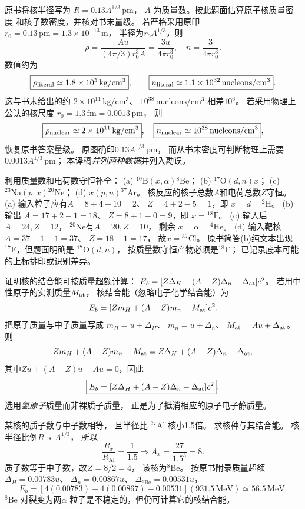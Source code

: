原书将核半径写为
$R=0.13A^{1/3}\,\mathrm{pm}$，
$A$ 为质量数。按此题面估算原子核质量密度
和核子数密度，并核对书末量级。
\exsolution
若严格采用原印
$r_0=0.13\,\mathrm{pm}=1.3\times10^{-13}\,\mathrm m$，
半径为$r_0A^{1/3}$，则
\[
 \rho=\frac{Au}{(4\pi/3)r_0^3A}
 =\frac{3u}{4\pi r_0^3},\quad
 n=\frac{3}{4\pi r_0^3}.
\]
数值约为
\[
 \boxed{\rho_{\rm literal}\simeq
 1.8\times10^{5}\,\mathrm{kg/cm^3}},\qquad
 \boxed{n_{\rm literal}\simeq
 1.1\times10^{32}\,\mathrm{nucleons/cm^3}}.
\]
这与书末给出的约
$2\times10^{11}\,\mathrm{kg/cm^3}$、
$10^{38}\,\mathrm{nucleons/cm^3}$
相差$10^6$。
若采用物理上公认的核尺度
$r_0=1.3\,\mathrm{fm}=0.0013\,\mathrm{pm}$，
则
\[
 \boxed{\rho_{\rm nuclear}\simeq
 2\times10^{11}\,\mathrm{kg/cm^3}},\quad
 \boxed{n_{\rm nuclear}\simeq
 10^{38}\,\mathrm{nucleons/cm^3}},
\]
恢复原书答案量级。
\excheck 原图确印$0.13A^{1/3}\,\mathrm{pm}$，
而从书末密度可判断物理上需要
$0.0013A^{1/3}\,\mathrm{pm}$；
本译稿\emph{并列两种数据}并列入勘误。

利用质量数和电荷数守恒补全：
(a) $\mathrm{^{10}B}(x,\alpha)\mathrm{^{8}Be}$；
(b) $\mathrm{^{17}O}(d,n)x$；
(c) $\mathrm{^{23}Na}(p,x)\mathrm{^{20}Ne}$；
(d) $x(p,n)\mathrm{^{37}Ar}$。
\exsolution
核反应的核子总数$A$和电荷总数$Z$守恒。
(a) 输入粒子应有$A=8+4-10=2$、
$Z=4+2-5=1$，即
$\boxed{x=d=\mathrm{^{2}H}}$。
(b) 输出
$A=17+2-1=18$、
$Z=8+1-0=9$，即
$\boxed{x=\mathrm{^{18}F}}$。
(c) 输入后$A=24,Z=12$，
$\mathrm{^{20}Ne}$有$A=20,Z=10$，
剩余 $\boxed{x=\alpha=\mathrm{^{4}He}}$。
(d) 输入靶核$A=37+1-1=37$、
$Z=18-1=17$，
故$\boxed{x=\mathrm{^{37}Cl}}$。
\excheck 原书简答(b)纯文本出现
$\mathrm{^{17}F}$，但题面明确是
$\mathrm{^{17}O}(d,n)$，
按质量数守恒产物必须是$\mathrm{^{18}F}$；
已记录底本可能的上标排印或识别差异。

证明核的结合能可按质量超额计算：
$E_b=[Z\Delta_H+(A-Z)\Delta_n-\Delta_{\rm at}]c^2$。
\exsolution
若用中性原子的实测质量$M_{\rm at}$，
核结合能（忽略电子化学结合能）为
\[
 E_b=[Zm_H+(A-Z)m_n-M_{\rm at}]c^2.
\]
把原子质量与中子质量写成
$m_H=u+\Delta_H$、
$m_n=u+\Delta_n$、
$M_{\rm at}=Au+\Delta_{\rm at}$。
则
\[
 Zm_H+(A-Z)m_n-M_{\rm at}
 =Z\Delta_H+(A-Z)\Delta_n-\Delta_{\rm at},
\]
其中$Zu+(A-Z)u-Au=0$，因此
\[
 \boxed{E_b=
 [Z\Delta_H+(A-Z)\Delta_n-\Delta_{\rm at}]c^2}.
\]
\excheck 选用\emph{氢原子}质量而非裸质子质量，
正是为了抵消相应的原子电子静质量。

某核的质子数与中子数相等，
且半径比 $\mathrm{^{27}Al}$ 核小1.5倍。
求核种与其结合能。
\exsolution
核半径比例$R\propto A^{1/3}$，
所以
\[
 \frac{R_x}{R_{\mathrm{Al}}}=\frac1{1.5}
 \Longrightarrow A_x=\frac{27}{1.5^3}=8.
\]
质子数等于中子数，故$Z=8/2=4$，
该核为$\boxed{\mathrm{^{8}Be}}$。
按原书附录质量超额
$\Delta_H=0.00783u$、
$\Delta_n=0.00867u$、
$\Delta_{\mathrm{^{8}Be}}=0.00531u$，
\[
 \boxed{E_b=
 [4(0.00783)+4(0.00867)-0.00531]
 (931.5\,\mathrm{MeV})
 \simeq56.5\,\mathrm{MeV}}.
\]
\excheck $\mathrm{^{8}Be}$ 对裂变为两$\alpha$
粒子是不稳定的，但仍可计算它的核结合能。

